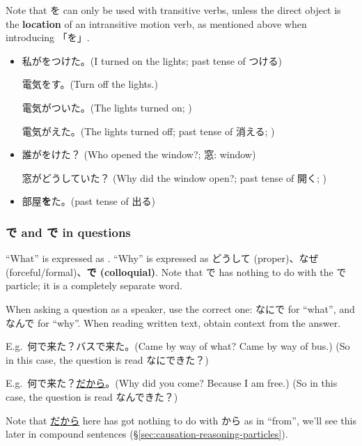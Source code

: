 \documentclass[../nihongo-gakushuu-kyouzai.tex]{subfiles}
\begin{document}
Note that を can only be used with transitive verbs, unless the direct object is the \textbf{location} of an intransitive motion verb, as mentioned above when introducing 「を」.
\begin{itemize}
    \item 私がをつけた。(I turned on the lights; past tense of つける)

    電気をす。(Turn off the lights.)

    電気がついた。(The lights turned on; )

    電気がえた。(The lights turned off; past tense of 消える; )
    \item 誰がをけた？ (Who opened the window?; 窓: window)

    窓がどうしていた？ (Why did the window open?; past tense of 開く; )
    \item 部屋\textbf{を}た。(past tense of 出る)
\end{itemize}

\subsubsection{で and で in questions}
``What'' is expressed as \textbf{}. ``Why'' is expressed as どうして (proper)、なぜ (forceful/formal)、\textbf{で (colloquial)}. Note that で has nothing to do with the で particle; it is a completely separate word.

When asking a question as a speaker, use the correct one: なにで for ``what'', and なんで for ``why''. When reading written text, obtain context from the answer. 

E.g.\ 何で来た？バスで来た。(Came by way of what? Came by  way of bus.) (So in this case, the question is read なにできた？)

E.g.\ 何で来た？\underline{だから}。(Why did you come? Because I am free.) (So in this case, the question is read なんできた？)

Note that \underline{だから} here has got nothing to do with から as in ``from'', we'll see this later in compound sentences (\S\ref{sec:causation-reasoning-particles}).
\end{document}
